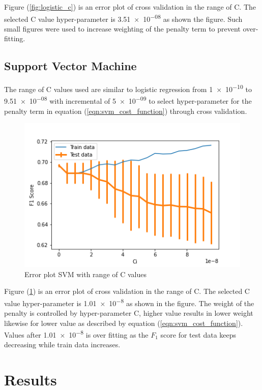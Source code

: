 \documentclass[transmag]{IEEEtran}
\begin{document}
\noindent Figure (\ref{fig:logistic_c}) is an error plot of cross validation in the range of C. The selected C value hyper-parameter is \num{3.51e-08} as shown the figure. Such small figures were used to increase weighting of the penalty term to prevent over-fitting.


\subsection{Support Vector Machine}
\noindent The range of C values used are similar to logistic regression from \num{1e-10} to \num{9.51e-08} with incremental of \num{5e-09} to select hyper-parameter for the penalty term in equation (\ref{eqn:svm_cost_function}) through cross validation.

\begin{figure}[h]
	\includegraphics[width=\columnwidth]{svm_cv_ci.png} 
    \caption{Error plot SVM with range of C values}%
    \label{fig:svm_c}%
\end{figure}

\noindent Figure (\ref{fig:svm_c}) is an error plot of cross validation in the range of C. The selected C value hyper-parameter is \num{1.01e-8} as shown in the figure. The weight of the penalty is controlled by hyper-parameter C, higher value results in lower weight likewise for lower value as described by equation (\ref{eqn:svm_cost_function}). Values after \num{1.01e-8} is over fitting as the $F_1$ score for test data keeps decreasing while train data increases.

\section{Results}
\end{document}
